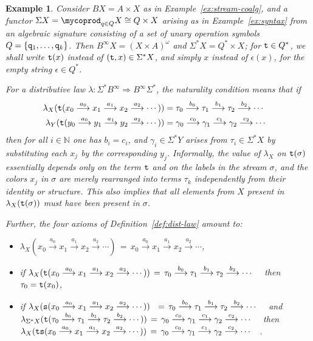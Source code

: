 \documentclass[adraft,copyright,creativecommons]{eptcs}
\newtheorem{example}[theorem]{Example}
\newcommand{\To}{\Longrightarrow}
\newcommand{\Bb}{B^{\infty}}
\newcommand{\Ss}{\Sigma^*}
\renewcommand{\S}{\Sigma}
\newcommand{\goes}[1]{\stackrel{#1}{\longrightarrow}}
\begin{document}
\begin{example}\label{ex:dist-laws}\rm
Consider $BX=A\times X$ as in Example~\ref{ex:stream-coalg}, and a functor $\S X = \mycoprod_{q\in Q}X \cong Q\times X$ arising as in Example~\ref{ex:syntax} from an algebraic signature consisting of a set of unary operation symbols $Q = \{{\tt q}_1,\ldots,{\tt q}_k\}$. Then $\Bb X = (X\times A)^{\omega}$ and $\Ss X = Q^*\times X$;  for ${\tt t}\in Q^*$, we shall write ${\tt t}(x)$ instead of $({\tt t},x)\in \Ss X$, and simply $x$ instead of $\epsilon(x)$, for the empty string $\epsilon\in Q^*$.

For a distributive law $\lambda:\Ss\Bb\To\Bb\Ss$, the naturality condition means that if
\begin{align*}
	\lambda_X({\tt t}(x_0 \goes{a_0} x_1 \goes{a_1} x_2 \goes{a_2} \cdots)) &= \tau_0\goes{b_0}\tau_1\goes{b_1}\tau_2\goes{b_2}\cdots\quad \\
	\lambda_Y({\tt t}(y_0 \goes{a_0} y_1 \goes{a_1} y_2 \goes{a_2} \cdots)) &= \gamma_0\goes{c_0}\gamma_1\goes{c_1}\gamma_2\goes{c_2}\cdots\quad
\end{align*}
then for all $i\in\mathbb{N}$ one has $b_i=c_i$, and $\gamma_i\in\Ss Y$ arises from $\tau_i\in\Ss X$ by substituting each $x_j$ by the corresponding $y_j$. Informally, the value of $\lambda_X$ on ${\tt t}(\sigma)$ essentially depends only on the term ${\tt t}$ and on the labels in the stream $\sigma$, and the colors $x_j$ in $\sigma$ are merely rearranged into terms $\tau_k$ independently from their identity or structure.
This also implies that all elements from $X$ present in $\lambda_X({\tt t}(\sigma))$ must have been present in $\sigma$.

Further, the four axioms of Definition~\ref{def:dist-law} amount to:
\begin{itemize}
\item[(i)] $\lambda_X(x_0 \goes{a_0} x_1 \goes{a_1} x_2 \goes{a_2} \cdots) \,= \, x_0 \goes{a_0} x_1 \goes{a_1} x_2 \goes{a_2} \cdots$,
\item[(ii)] if $\lambda_X({\tt t}(x_0 \goes{a_0} x_1 \goes{a_1} x_2 \goes{a_2} \cdots)) \, = \, \tau_0\goes{b_0}\tau_1\goes{b_1}\tau_2\goes{b_2}\cdots\quad$ then $\tau_0={\tt t}(x_0)$,
\item[(iii)] if $\lambda_X({\tt s}(x_0 \goes{a_0} x_1 \goes{a_1} x_2 \goes{a_2} \cdots)) \quad\!\! = \, \tau_0\goes{b_0}\tau_1\goes{b_1}\tau_2\goes{b_2}\cdots\quad$ and \\
		  \hspace*{6pt} $\lambda_{\Ss X}({\tt t}(\tau_0 \goes{b_0} \tau_1 \goes{b_1} \tau_2 \goes{b_2} \cdots)) \, = \, \gamma_0\goes{c_0}\gamma_1\goes{c_1}\gamma_2\goes{c_2}\cdots\quad$ then \\
		  \hspace*{6pt} $\lambda_{X}({\tt ts}(x_0 \goes{a_0} x_1 \goes{a_1} x_2 \goes{a_2} \cdots)) \, = \, \gamma_0\goes{c_0}\gamma_1\goes{c_1}\gamma_2\goes{c_2}\cdots\quad$.
		  

\end{itemize}
\end{example}
\end{document}
